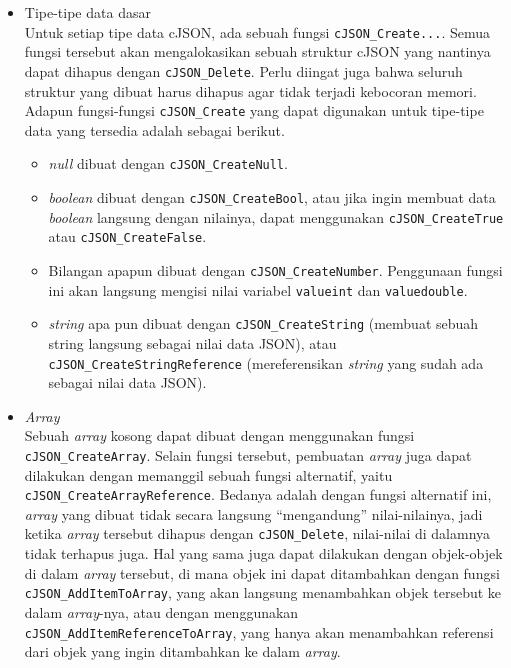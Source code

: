 \begin{itemize}[listparindent=\parindent]
	\item Tipe-tipe data dasar\\
	Untuk setiap tipe data cJSON, ada sebuah fungsi \verb|cJSON_Create...|. Semua fungsi \mbox{tersebut} \mbox{akan} mengalokasikan sebuah struktur cJSON yang nantinya dapat dihapus dengan \verb|cJSON_|\linebreak\verb|Delete|. Perlu diingat juga bahwa seluruh struktur yang dibuat harus dihapus agar tidak terjadi kebocoran memori. Adapun fungsi-fungsi \verb|cJSON_Create| yang dapat digunakan untuk tipe-tipe data yang tersedia adalah sebagai berikut.
	
	\begin{itemize}
		\item \textit{null} dibuat dengan \verb|cJSON_CreateNull|.
		\item \textit{boolean} dibuat dengan \verb|cJSON_CreateBool|, atau jika ingin membuat data \textit{boolean} langsung dengan nilainya, dapat menggunakan \verb|cJSON_CreateTrue| atau \verb|cJSON_CreateFalse|.
		\item Bilangan apapun dibuat dengan \verb|cJSON_CreateNumber|. Penggunaan fungsi ini akan langsung mengisi nilai variabel \verb|valueint| dan \verb|valuedouble|.
		\item \textit{string} apa pun dibuat dengan \verb|cJSON_CreateString| (membuat sebuah string langsung sebagai nilai data JSON), atau \verb|cJSON_CreateStringReference| (mereferensikan \textit{string} yang sudah ada sebagai nilai data JSON).
	\end{itemize}
	
	\item \textit{Array}\\
	Sebuah \textit{array} kosong dapat dibuat dengan menggunakan fungsi \verb|cJSON_CreateArray|. Selain fungsi tersebut, pembuatan \textit{array} juga dapat dilakukan dengan memanggil sebuah fungsi alternatif, yaitu \verb|cJSON_CreateArrayReference|. Bedanya adalah dengan fungsi alternatif ini, \textit{array} yang dibuat tidak secara langsung ``mengandung'' nilai-nilainya, jadi ketika \textit{array} tersebut dihapus dengan \verb|cJSON_Delete|, nilai-nilai di dalamnya tidak terhapus juga. Hal yang sama juga dapat dilakukan dengan objek-objek di dalam \textit{array} tersebut, di mana objek ini dapat ditambahkan dengan fungsi \verb|cJSON_AddItemToArray|, yang akan langsung menambahkan objek tersebut ke dalam \textit{array}-nya, atau dengan menggunakan \verb|cJSON_AddItemReferenceToArray|, yang hanya akan menambahkan referensi dari objek yang ingin ditambahkan ke dalam \textit{array}.
	

\end{itemize}
